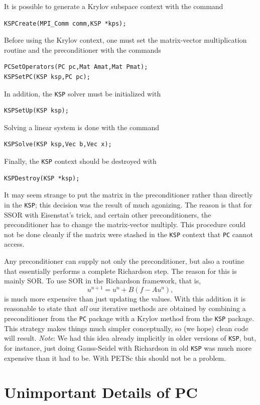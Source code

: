 {{It is possible to generate a Krylov subspace context with the
command
\begin{lstlisting}
KSPCreate(MPI_Comm comm,KSP *kps);
\end{lstlisting}
Before using the Krylov context, one must set the matrix-vector multiplication routine and
the preconditioner with the
commands
\begin{lstlisting}
PCSetOperators(PC pc,Mat Amat,Mat Pmat);
KSPSetPC(KSP ksp,PC pc);
\end{lstlisting}
In addition, the \lstinline{KSP} solver must be initialized with
\begin{lstlisting}
KSPSetUp(KSP ksp);
\end{lstlisting}
Solving a linear system is done with the command
\begin{lstlisting}
KSPSolve(KSP ksp,Vec b,Vec x);
\end{lstlisting}
Finally, the \lstinline{KSP} context should be destroyed with
\begin{lstlisting}
KSPDestroy(KSP *ksp);
\end{lstlisting}

It may seem strange to put the matrix in the preconditioner rather
than directly in the \lstinline{KSP}; this decision was the result of much
agonizing. The reason is that for SSOR with Eisenstat's trick, and
certain other preconditioners, the
preconditioner has to change the matrix-vector multiply.  This
procedure could not
be done cleanly if the matrix were stashed in the \lstinline{KSP} context that
\lstinline{PC} cannot access.

Any preconditioner can supply not
only the preconditioner, but also a routine that essentially performs a
complete Richardson step. The reason for this is mainly SOR. To
use SOR in the Richardson framework, that is,
\[
  u^{n+1} = u^{n} + B(f - A u^{n}),
\]
is much more expensive than just updating the values.
With this addition it is reasonable to state that {\em all} our
iterative methods are obtained by combining a preconditioner from
the \lstinline{PC} package with a Krylov method from the \lstinline{KSP}
package. This strategy makes things much simpler conceptually, so
(we hope)
clean code will result. {\em Note}: We had this idea already implicitly in
older versions of \lstinline{KSP}, but, for instance, just doing Gauss-Seidel
with Richardson in old \lstinline{KSP} was much more expensive than it had to be.
With PETSc this should not be a problem.

\section{Unimportant Details of PC}

}}

